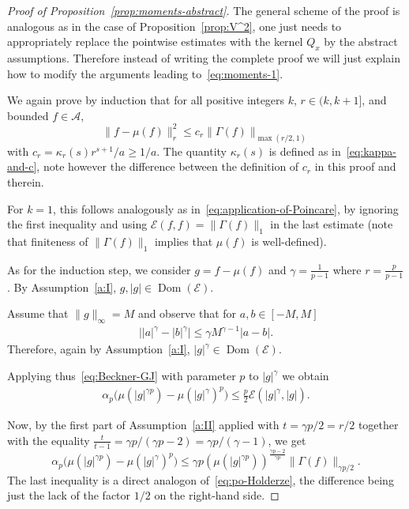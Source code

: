 \documentclass[a4paper]{amsart}
\theoremstyle{definition}
\theoremstyle{remark}
\numberwithin{equation}{section}
\DeclareMathOperator{\Dom}{Dom} %
\newcommand*{\calE}{\mathcal{E}}
\begin{document}
\begin{proof}[Proof of Proposition~\ref{prop:moments-abstract}]
The general scheme of the proof is analogous as in the case of Proposition~\ref{prop:V^2}, one just needs to appropriately replace the pointwise estimates with the kernel $Q_x$ by the abstract assumptions. Therefore instead of writing the complete proof we will just explain how to modify the arguments leading to~\eqref{eq:moments-1}.

We again prove by induction that for all positive integers $k$, $r \in (k,k+1]$, and bounded $f \in \mathcal{A}$,
\begin{displaymath}
  \|f - \mu(f)\|_r^2 \le c_r \|\Gamma(f)\|_{\max(r/2,1)}
\end{displaymath}
with $c_r = \kappa_r(s)r^{s+1}/a\ge 1/a$. The quantity $\kappa_r(s)$ is defined as in~\eqref{eq:kappa-and-c}, note however the difference between the definition of $c_r$ in this proof and therein.

For $k = 1$, this follows analogously as in~\eqref{eq:application-of-Poincare}, by ignoring the first inequality and using $\calE(f,f) = \|\Gamma(f)\|_1$ in the last estimate (note that finiteness of $\|\Gamma(f)\|_1$ implies that $\mu(f)$ is well-defined).

As for the induction step, we consider $g = f - \mu(f)$ and $\gamma = \frac{1}{p-1}$ where $r = \frac{p}{p-1}$. By Assumption~\ref{a:I}, $g, |g| \in \Dom(\calE)$.


Assume that $\|g\|_\infty = M$ and observe that for $a,b \in [-M,M]$
\begin{align*}
\bigl| |a|^\gamma - |b|^\gamma\bigr| \le \gamma M^{\gamma-1}|a-b|.
\end{align*}
Therefore, again by Assumption~\ref{a:I}, $|g|^\gamma \in \Dom(\calE)$.

Applying thus~\eqref{eq:Beckner-GJ} with parameter $p$ to $|g|^\gamma$ we obtain
\begin{align}\label{eq:beckner-application}
	\alpha_p\bigl(\mu(|g|^{\gamma p})	 - \mu(|g|^\gamma)^p\bigr)\le \frac{p}{2}\mathcal{E}(|g|^\gamma,|g|).
\end{align}

Now, by the first part of Assumption~\ref{a:II} applied with $t = \gamma p/2 = r/2$ together with the equality $\frac{t}{t-1} = \gamma p/(\gamma p - 2) = \gamma p/(\gamma -1)$, we get
\begin{displaymath}
  \alpha_p\bigl(\mu(|g|^{\gamma p})	 - \mu(|g|^\gamma)^p\bigr)\le \gamma p ( \mu(|g|^{\gamma p}))^{\frac{\gamma p -2}{\gamma p}}\|\Gamma(f)\|_{\gamma p/2}.
\end{displaymath}
The last inequality is a direct analogon of~\eqref{eq:po-Holderze}, the difference being just the lack of the factor $1/2$ on the right-hand side.


\end{proof}
\end{document}
